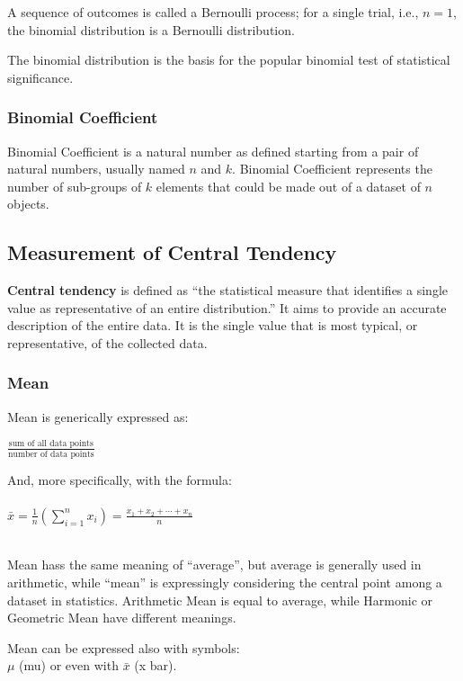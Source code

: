 \documentclass{article}
\begin{document}
A sequence of outcomes is called a Bernoulli process; for a single trial, i.e., $n = 1$, the binomial distribution is a Bernoulli distribution. 

The binomial distribution is the basis for the popular binomial test of statistical significance.

\subsubsection{Binomial Coefficient}
Binomial Coefficient is a natural number as defined starting from a pair of natural numbers, usually named $n$ and $k$. 
Binomial Coefficient represents the number of sub-groups of $k$ elements that could be made out of a dataset of $n$ objects.

\subsection{Measurement of Central Tendency}
\textbf{Central tendency} is defined as “the statistical measure that identifies a single value as representative of an entire distribution.” It aims to provide an accurate description of the entire data. It is the single value that is most typical, or representative, of the collected data.

\subsubsection{Mean}
Mean is generically expressed as:

$\frac{\text{sum of all data points}}{\text{number of data points}}$

And, more specifically, with the formula:\\
\mbox{} \\

${\displaystyle {\bar{x}}={\frac{1}{n}}\left(\sum _{i=1}^{n}{x_{i}}\right)={\frac{x_{1}+x_{2}+\cdots +x_{n}}{n}}}$

\mbox{} \\

Mean hass the same meaning of “average”, but average is generally used in arithmetic, while “mean” is expressingly considering the central point among a dataset in statistics. Arithmetic Mean is equal to average, while Harmonic or Geometric Mean have different meanings. 

Mean can be expressed also with symbols:\\
$\mu$ (mu) or even with $\bar{x}$ (x bar).
\end{document}
